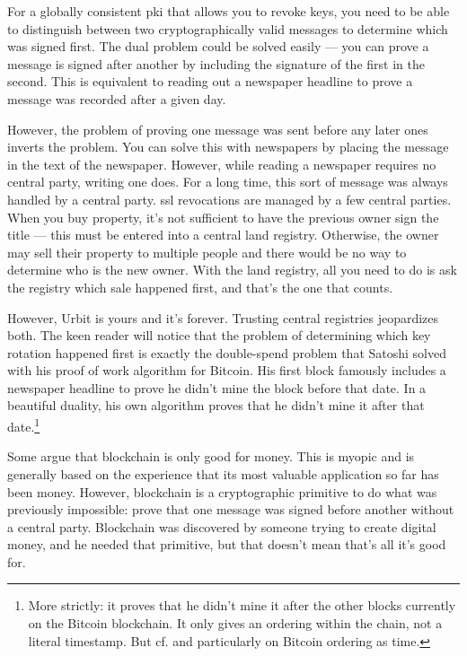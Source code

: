 \documentclass[twoside]{article}
\begin{document}
For a globally consistent {\sc pki} that allows you to revoke keys, you need
to be able to distinguish between two cryptographically valid messages
to determine which was signed first. The dual problem could be solved
easily --- you can prove a message is signed after another by including
the signature of the first in the second. This is equivalent to reading
out a newspaper headline to prove a message was recorded after a given
day.

However, the problem of proving one message was sent before any later
ones inverts the problem. You can solve this with newspapers by placing
the message in the text of the newspaper. However, while reading a
newspaper requires no central party, writing one does. For a long time,
this sort of message was always handled by a central party. {\sc ssl}
revocations are managed by a few central parties. When you buy property,
it's not sufficient to have the previous owner sign the title --- this
must be entered into a central land registry. Otherwise, the owner may
sell their property to multiple people and there would be no way to
determine who is the new owner. With the land registry, all you need to
do is ask the registry which sale happened first, and that's the one
that counts.

However, Urbit is yours and it's forever. Trusting central registries
jeopardizes both. The keen reader will notice that the problem of
determining which key rotation happened first is exactly the
double-spend problem that Satoshi solved with his proof of work
algorithm for Bitcoin. His first block famously includes a newspaper
headline to prove he didn't mine the block before that date. In a
beautiful duality, his own algorithm proves that he didn't mine it after
that date.\footnote{More strictly: it proves that he didn't mine it after the other blocks
currently on the Bitcoin blockchain. It only gives an ordering within
the chain, not a literal
timestamp.  But cf. \citet{Gigi2019} and particularly \citet{Gigi2021} on Bitcoin ordering as time.}

Some argue that blockchain is only good for money. This is myopic and is
generally based on the experience that its most valuable application so
far has been money. However, blockchain is a cryptographic primitive to
do what was previously impossible: prove that one message was signed
before another without a central party. Blockchain was discovered by
someone trying to create digital money, and he needed that primitive,
but that doesn't mean that's all it's good for.
\end{document}
